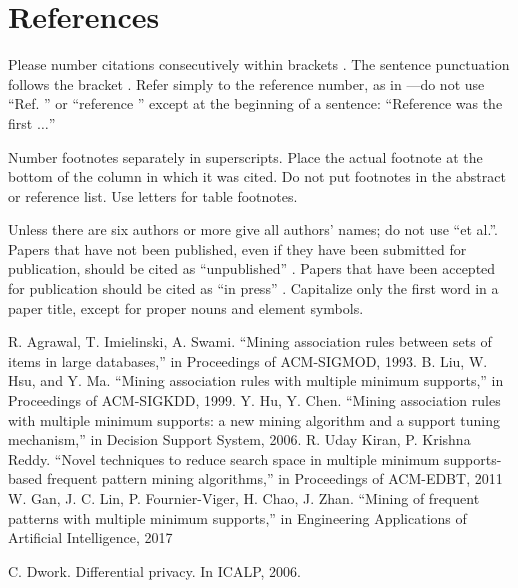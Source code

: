 \documentclass[conference]{IEEEtran}
\begin{document}
\section*{References}

Please number citations consecutively within brackets \cite{b1}. The 
sentence punctuation follows the bracket \cite{b2}. Refer simply to the reference 
number, as in \cite{b3}---do not use ``Ref. \cite{b3}'' or ``reference \cite{b3}'' except at 
the beginning of a sentence: ``Reference \cite{b3} was the first $\ldots$''

Number footnotes separately in superscripts. Place the actual footnote at 
the bottom of the column in which it was cited. Do not put footnotes in the 
abstract or reference list. Use letters for table footnotes.

Unless there are six authors or more give all authors' names; do not use 
``et al.''. Papers that have not been published, even if they have been 
submitted for publication, should be cited as ``unpublished'' \cite{b4}. Papers 
that have been accepted for publication should be cited as ``in press'' \cite{b5}. 
Capitalize only the first word in a paper title, except for proper nouns and 
element symbols.

\begin{thebibliography}{00}%
 R. Agrawal, T. Imielinski, A. Swami. ``Mining association rules between sets of items in large databases,'' in Proceedings of ACM-SIGMOD, 1993.
 B. Liu, W. Hsu, and Y. Ma. ``Mining association rules with multiple minimum supports,'' in Proceedings of ACM-SIGKDD, 1999.
 Y. Hu, Y. Chen. ``Mining association rules with multiple minimum supports: a new mining algorithm and a support tuning mechanism,'' in Decision Support System, 2006.
 R. Uday Kiran, P. Krishna Reddy. ``Novel techniques to reduce search space in multiple minimum supports-based frequent pattern mining algorithms,'' in Proceedings of ACM-EDBT, 2011
 W. Gan, J. C. Lin, P. Fournier-Viger, H. Chao, J. Zhan. ``Mining of frequent patterns with multiple minimum supports,'' in Engineering Applications of Artificial Intelligence, 2017

 C. Dwork. Differential privacy. In ICALP, 2006.

\end{thebibliography}
\end{document}
